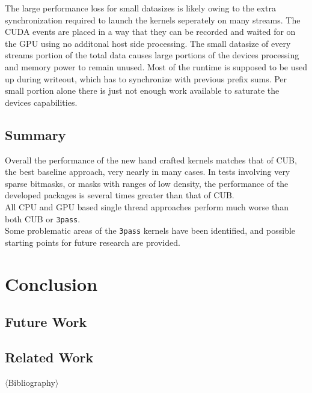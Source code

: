 \documentclass{tudscrreprt}
\newcommand{\markr}[1]{\textcolor{review}{$\langle$#1$\rangle$}}
\begin{document}
			The large performance loss for small datasizes is likely owing to the extra synchronization required to launch the kernels seperately on many streams. The CUDA events are placed in a way that they can be recorded and waited for on the GPU using no additonal host side processing. The small datasize of every streams portion of the total data causes large portions of the devices processing and memory power to remain unused. Most of the runtime is supposed to be used up during writeout, which has to synchronize with previous prefix sums. Per small portion alone there is just not enough work available to saturate the devices capabilities. \\
		
		\section{Summary}
			Overall the performance of the new hand crafted kernels matches that of CUB, the best baseline approach, very nearly in many cases. In tests involving very sparse bitmasks, or masks with ranges of low density, the performance of the developed packages is several times greater than that of CUB. \\
			All CPU and GPU based single thread approaches perform much worse than both CUB or \texttt{3pass}. \\
			
			Some problematic areas of the \texttt{3pass} kernels have been identified, and possible starting points for future research are provided. \\
		
	\chapter{Conclusion}
	
		\section{Future Work}
	
		\section{Related Work}
		
	\markr{Bibliography}\\
	
\end{document}
